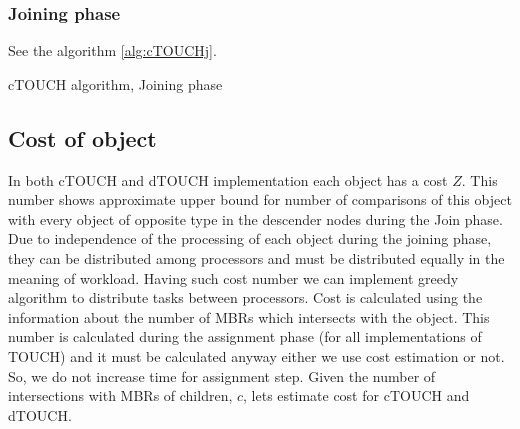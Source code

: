 \documentclass{sig-alternate}
\begin{document}
\subsubsection{Joining phase}

See the algorithm \ref{alg:cTOUCHj}.

\begin{algorithm}
\caption{cTOUCH algorithm, Joining phase}
\label{alg:cTOUCHj}
\begin{algorithmic}[1]
	\If{$\textcolor{blue}{o} \cap \textcolor{red}{o} \neq \varnothing$}
	\EndIf
      \EndFor
    \EndFor
  \EndFor
  
	\If{$\textcolor{red}{o} \cap \textcolor{blue}{o} \neq \varnothing$}
	\EndIf
      \EndFor
    \EndFor
  \EndFor
  
      \If{$\textcolor{blue}{o} \cap \textcolor{red}{o} \neq \varnothing$}
      \EndIf
  \EndFor
\EndFor
\end{algorithmic}
\end{algorithm}

\subsection{Cost of object}
In both cTOUCH and dTOUCH implementation each object has a cost $Z$. This number shows approximate upper bound for number of comparisons of this object with every object of opposite type in the descender nodes during the Join phase. Due to independence of the processing of each object during the joining phase, they can be distributed among processors and must be distributed equally in the meaning of workload. Having such cost number we can implement greedy algorithm to distribute tasks between processors. Cost is calculated using the information about the number of MBRs which intersects with the object. This number is calculated during the assignment phase (for all implementations of TOUCH) and it must be calculated anyway either we use cost estimation or not. So, we do not increase time for assignment step. Given the number of intersections with MBRs of children, $c$, lets estimate cost for cTOUCH and dTOUCH.
\end{document}
